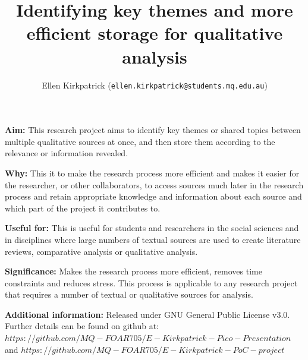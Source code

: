 \documentclass[unknownkeysallowed,usepdftitle=false, parskip=full]{beamer}
\title{Identifying key themes and more efficient storage for qualitative analysis}
\author{Ellen Kirkpatrick\inst{1} (\texttt{ellen.kirkpatrick@students.mq.edu.au}) \inst{1}}
\institute{\inst{1}Macquarie University, Sydney, NSW}
\newcommand{\secvariable}{nothing}
\newcommand{\mysection}[1]{\renewcommand{\secvariable}{#1}
}
\begin{document}
\mysection{abstract}
\begin{frame}\label{\secvariable}


\parbox{\linewidth}{


\textbf{Aim:} This research project aims to identify key themes or shared topics between multiple qualitative sources at once, and then store them according to the relevance or information revealed.
\vspace{12pt}

\textbf{Why:} This it to make the research process more efficient and makes it easier for the researcher, or other collaborators, to access sources much later in the research process and retain appropriate knowledge and information about each source and which part of the project it contributes to.
\vspace{12pt}

\textbf{Useful for:} This is useful for students and researchers in the social sciences and in disciplines where large numbers of textual sources are used to create literature reviews, comparative analysis or qualitative analysis.
\vspace{12pt}

\textbf{Significance:} Makes the research process more efficient, removes time constraints and reduces stress. This process is applicable to any research project that requires a number of textual or qualitative sources for analysis.
\vspace{12pt}

\textbf{Additional information:} Released under GNU General Public License v3.0. Further details can be found on github at: $https://github.com/MQ-FOAR705/E-Kirkpatrick-Pico-Presentation$ and $https://github.com/MQ-FOAR705/E-Kirkpatrick-PoC-project$

}
 
  
\end{frame}
\end{document}

